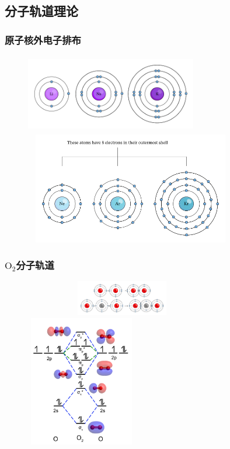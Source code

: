 {\subsection{分子轨道理论}
\frame
{
	\frametitle{原子核外电子排布}
\begin{figure}[h!]
\vspace*{-0.35in}
\centering
\includegraphics[height=1.35in,width=2.95in,viewport=0 0 500 230,clip]{Figures/Li-Na-K.png}
\includegraphics[height=1.92in,width=3.65in,viewport=0 0 500 275,clip]{Figures/Ne-Ar-Kr.png}
\label{Electron_in_atom}
\end{figure}
}

\frame
{
	\frametitle{$\mathrm{O}_2$分子轨道}
\begin{figure}[h!]
\centering
\vspace{-15.5pt}
\includegraphics[height=0.60in,width=3.35in,viewport=0 100 500 200,clip]{Figures/Octet-Rule-O2_CO2.png}
\includegraphics[height=2.25in,width=1.90in,viewport=0 0 150 170,clip]{Figures/MO-O2.png}
\label{MO:O2}
\end{figure}
}

}
